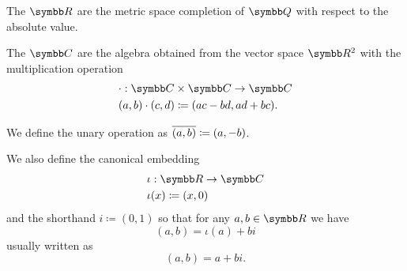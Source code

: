 \begin{definition}\label{def:real_numbers}
  The  \( \R \) are the metric space completion of \( \Q \) with respect to the absolute value.
\end{definition}

\begin{definition}\label{def:complex_numbers}
  The  \( \Co \) are the algebra obtained from the vector space \( \R^2 \) with the multiplication operation
  \begin{align*}
    &\cdot: \Co \times \Co \to \Co \\
    &(a, b) \cdot (c, d) \coloneqq (ac - bd, ad + bc).
  \end{align*}

  We define the unary  operation as \( \overline{(a, b)} \coloneqq (a, -b) \).

  We also define the canonical embedding
  \begin{align*}
    &\iota: \R \to \Co \\
    &\iota(x) \coloneqq (x, 0)
  \end{align*}
  and the shorthand \( i \coloneqq (0, 1) \) so that for any \( a, b \in \R \) we have
  \begin{equation*}
    (a, b) = \iota(a) + bi
  \end{equation*}
  usually written as
  \begin{equation*}
    (a, b) = a + bi.
  \end{equation*}
\end{definition}
